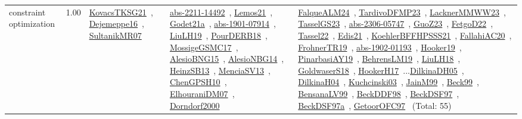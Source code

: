 {\begin{longtable}{p{3cm}r>{\raggedright\arraybackslash}p{6cm}>{\raggedright\arraybackslash}p{6cm}>{\raggedright\arraybackslash}p{8cm}}
\index{constraint optimization}\index{CP!constraint optimization}constraint optimization &  1.00 & \href{../works/KovacsTKSG21.pdf}{KovacsTKSG21}~\cite{KovacsTKSG21}, \href{../works/Dejemeppe16.pdf}{Dejemeppe16}~\cite{Dejemeppe16}, \href{../works/SultanikMR07.pdf}{SultanikMR07}~\cite{SultanikMR07} & \href{../works/abs-2211-14492.pdf}{abs-2211-14492}~\cite{abs-2211-14492}, \href{../works/Lemos21.pdf}{Lemos21}~\cite{Lemos21}, \href{../works/Godet21a.pdf}{Godet21a}~\cite{Godet21a}, \href{../works/abs-1901-07914.pdf}{abs-1901-07914}~\cite{abs-1901-07914}, \href{../works/LiuLH19.pdf}{LiuLH19}~\cite{LiuLH19}, \href{../works/PourDERB18.pdf}{PourDERB18}~\cite{PourDERB18}, \href{../works/MossigeGSMC17.pdf}{MossigeGSMC17}~\cite{MossigeGSMC17}, \href{../works/AlesioBNG15.pdf}{AlesioBNG15}~\cite{AlesioBNG15}, \href{../works/AlesioNBG14.pdf}{AlesioNBG14}~\cite{AlesioNBG14}, \href{../works/HeinzSB13.pdf}{HeinzSB13}~\cite{HeinzSB13}, \href{../works/MenciaSV13.pdf}{MenciaSV13}~\cite{MenciaSV13}, \href{../works/ChenGPSH10.pdf}{ChenGPSH10}~\cite{ChenGPSH10}, \href{../works/ElhouraniDM07.pdf}{ElhouraniDM07}~\cite{ElhouraniDM07}, \href{../works/Dorndorf2000.pdf}{Dorndorf2000}~\cite{Dorndorf2000} & \href{../works/FalqueALM24.pdf}{FalqueALM24}~\cite{FalqueALM24}, \href{../works/TardivoDFMP23.pdf}{TardivoDFMP23}~\cite{TardivoDFMP23}, \href{../works/LacknerMMWW23.pdf}{LacknerMMWW23}~\cite{LacknerMMWW23}, \href{../works/TasselGS23.pdf}{TasselGS23}~\cite{TasselGS23}, \href{../works/abs-2306-05747.pdf}{abs-2306-05747}~\cite{abs-2306-05747}, \href{../works/GuoZ23.pdf}{GuoZ23}~\cite{GuoZ23}, \href{../works/FetgoD22.pdf}{FetgoD22}~\cite{FetgoD22}, \href{../works/Tassel22.pdf}{Tassel22}~\cite{Tassel22}, \href{../works/Edis21.pdf}{Edis21}~\cite{Edis21}, \href{../works/KoehlerBFFHPSSS21.pdf}{KoehlerBFFHPSSS21}~\cite{KoehlerBFFHPSSS21}, \href{../works/FallahiAC20.pdf}{FallahiAC20}~\cite{FallahiAC20}, \href{../works/FrohnerTR19.pdf}{FrohnerTR19}~\cite{FrohnerTR19}, \href{../works/abs-1902-01193.pdf}{abs-1902-01193}~\cite{abs-1902-01193}, \href{../works/Hooker19.pdf}{Hooker19}~\cite{Hooker19}, \href{../works/PinarbasiAY19.pdf}{PinarbasiAY19}~\cite{PinarbasiAY19}, \href{../works/BehrensLM19.pdf}{BehrensLM19}~\cite{BehrensLM19}, \href{../works/LiuLH18.pdf}{LiuLH18}~\cite{LiuLH18}, \href{../works/GoldwaserS18.pdf}{GoldwaserS18}~\cite{GoldwaserS18}, \href{../works/HookerH17.pdf}{HookerH17}~\cite{HookerH17}...\href{../works/DilkinaDH05.pdf}{DilkinaDH05}~\cite{DilkinaDH05}, \href{../works/DilkinaH04.pdf}{DilkinaH04}~\cite{DilkinaH04}, \href{../works/Kuchcinski03.pdf}{Kuchcinski03}~\cite{Kuchcinski03}, \href{../works/JainM99.pdf}{JainM99}~\cite{JainM99}, \href{../works/Beck99.pdf}{Beck99}~\cite{Beck99}, \href{../works/BensanaLV99.pdf}{BensanaLV99}~\cite{BensanaLV99}, \href{../works/BeckDDF98.pdf}{BeckDDF98}~\cite{BeckDDF98}, \href{../works/BeckDSF97.pdf}{BeckDSF97}~\cite{BeckDSF97}, \href{../works/BeckDSF97a.pdf}{BeckDSF97a}~\cite{BeckDSF97a}, \href{../works/GetoorOFC97.pdf}{GetoorOFC97}~\cite{GetoorOFC97} (Total: 55)\\

\end{longtable}}
